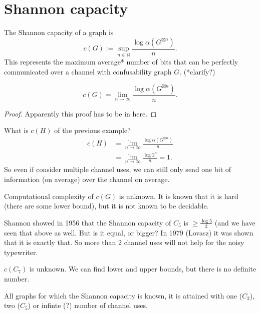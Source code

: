 \section{Shannon capacity}
\begin{definition}
The Shannon capacity of a graph is \[c(G) := \sup_{n \in \mathds{N}} \frac{\log \alpha(G^{\boxtimes n})}{n}.\]
This represents the maximum average* number of bits that can be perfectly communicated over a channel with confusability graph $G$.
(*clarify?)
\end{definition}

\begin{proposition}
\[
c(G) = \lim_{n \to \infty} \frac{\log \alpha(G^{\boxtimes n})}{n}.
\]
\end{proposition}
\begin{proof}
Apparently this proof has to be in here.
\end{proof}

\begin{example}
What is $c(H)$ of the previous example?
\begin{align*}
c(H) &=  \lim_{n \to \infty} \frac{\log \alpha(G^{\boxtimes n})}{n}\\
&= \lim_{n \to \infty} \frac{\log 2^n}{n} = 1.
\end{align*}
So even if consider multiple channel uses, we can still only send one bit of information (on average) over the channel on average.
\end{example}

Computational complexity of $c(G)$ is unknown. It is known that it is hard (there are some lower bound), but it is not known to be decidable.

Shannon showed in 1956 that the Shannon capacity of $C_5$ is $\geq \frac{\log 5}{2}$ (and we have seen that above as well. But is it equal, or bigger? In 1979 (Lovasz) it was shown that it is exactly that. So more than 2 channel uses will not help for the noisy typewriter.

$c(C_7)$ is unknown. We can find lower and upper bounds, but there is no definite number.

All graphs for which the Shannon capacity is known, it is attained with one ($C_2$), two ($C_5$) or infinte (?) number of channel uses.